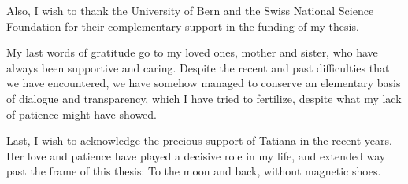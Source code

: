 \begin{acknowledgements}
\bigskip
Also, I wish to thank the University of Bern and the Swiss National Science Foundation for their complementary support in the funding of my thesis.

\bigskip
My last words of gratitude go to my loved ones, mother and sister, who have always been supportive and caring.
Despite the recent and past difficulties that we have encountered, we have somehow managed to conserve an elementary basis of dialogue and transparency, which I have tried to fertilize, despite what my lack of patience might have showed.

\bigskip
Last, I wish to acknowledge the precious support of Tatiana in the recent years.
Her love and patience have played a decisive role in my life, and extended way past the frame of this thesis: To the moon and back, without magnetic shoes.


\end{acknowledgements}

